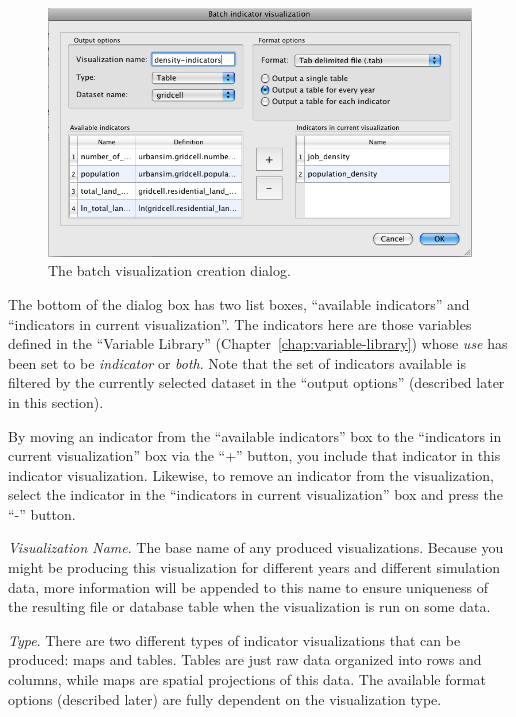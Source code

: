 \begin{figure}[tph]
\begin{center}
\includegraphics[width=\textwidth]{part-gui/images/result-manager-batch-viz-config.png}
\end{center}
\caption{The batch visualization creation dialog.}
\label{fig:results-manager-batch-viz}
\end{figure}


The bottom of the dialog box has two list boxes,  ``available
indicators'' and  ``indicators in current visualization''. The
indicators here are those variables defined in the 
``Variable Library'' (Chapter~\ref{chap:variable-library}) whose
\emph{use} has been set to be \emph{indicator} or \emph{both}. Note that the set of
indicators available is filtered by the currently selected dataset in
the  ``output options'' (described later in this section).

By moving an indicator from the  ``available indicators'' box to the
 ``indicators in current visualization'' box via the  ``+'' button, you
include that indicator in this indicator visualization. Likewise, to
remove an indicator from the visualization, select the indicator in
the  ``indicators in current visualization'' box and press the  ``-''
button.



\emph{Visualization Name}. The base name of any produced
visualizations. Because you might be producing this visualization for
different years and different simulation data, more information will
be appended to this name to ensure uniqueness of the resulting file
or database table when the visualization is run on some data. 

\emph{Type}. There are two different types of indicator
visualizations that can be produced: maps and tables. Tables are just
raw data organized into rows and columns, while maps are
spatial projections of this data. The available format options
(described later) are fully dependent on the visualization type. 


